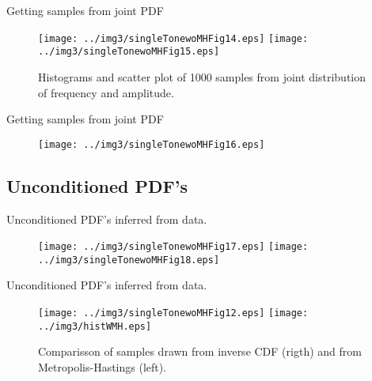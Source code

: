 ﻿\documentclass[mathserif]{beamer}
\begin{document}
	\begin{frame}{Getting samples from joint PDF}
		\begin{figure}
			\centering
			\texttt{[image: ../img3/singleTonewoMHFig14.eps]}				
			\texttt{[image: ../img3/singleTonewoMHFig15.eps]}
			\caption{Histograms and scatter plot of 1000 samples from joint distribution of frequency and amplitude.}
		\end{figure}
	\end{frame}
	
	\begin{frame}{Getting samples from joint PDF}
		\begin{figure}
			\centering
			\texttt{[image: ../img3/singleTonewoMHFig16.eps]}
		\end{figure}
	\end{frame}
	
	
	\subsection{Unconditioned PDF's}
	\begin{frame}{Unconditioned PDF's inferred from data.}
		\begin{figure}
			\centering
			\texttt{[image: ../img3/singleTonewoMHFig17.eps]}
			\texttt{[image: ../img3/singleTonewoMHFig18.eps]}
		\end{figure}
	\end{frame}
	
	\begin{frame}{Unconditioned PDF's inferred from data.}
		\begin{figure}
			\centering
			\texttt{[image: ../img3/singleTonewoMHFig12.eps]}
			\texttt{[image: ../img3/histWMH.eps]}
			\caption{Comparisson of samples drawn from inverse CDF (rigth) and from Metropolis-Hastings (left).}
		\end{figure}
		
		
	\end{frame}
	
	
	
\end{document}

